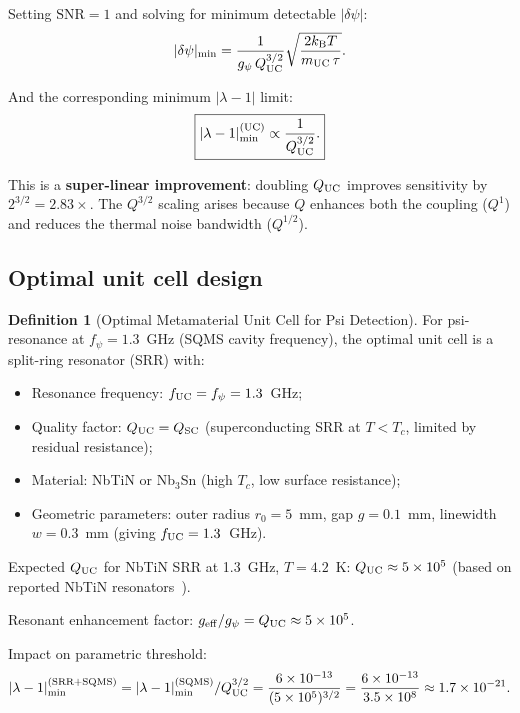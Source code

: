 \documentclass[11pt,twocolumn]{article}
\newcommand{\dpsi}{\delta\psi}
\newcommand{\lam}{\lambda}
\newcommand{\ee}[1]{\times 10^{#1}}
\newcommand{\kB}{k_{\mathrm{B}}}
\newcommand{\SNR}{\mathrm{SNR}}
\theoremstyle{definition}
\newtheorem{definition}[theorem]{Definition}
\theoremstyle{remark}
\begin{document}
Setting $\SNR = 1$ and solving for minimum detectable $|\dpsi|$:
\begin{equation}
|\dpsi|_{\rm min} = \frac{1}{g_\psi\,Q_{\rm UC}^{3/2}}
\sqrt{\frac{2\kB T}{m_{\rm UC}\,\tau}}.
\label{eq:dpsi_min_UC}
\end{equation}

And the corresponding minimum $|\lam-1|$ limit:
\begin{equation}
\boxed{
|\lam-1|_{\rm min}^{(\rm UC)} \propto \frac{1}{Q_{\rm UC}^{3/2}}.
}
\label{eq:lambda_min_UC}
\end{equation}

This is a \textbf{super-linear improvement}: doubling $Q_{\rm UC}$
improves sensitivity by $2^{3/2} = 2.83\times$.  The $Q^{3/2}$ scaling
arises because $Q$ enhances both the coupling ($Q^1$) and reduces the
thermal noise bandwidth ($Q^{1/2}$).

\subsection{Optimal unit cell design}
\label{sec:UC_design}

\begin{definition}[Optimal Metamaterial Unit Cell for Psi Detection]
\label{def:optimal_UC}
For psi-resonance at $f_\psi = 1.3$~GHz (SQMS cavity frequency), the
optimal unit cell is a split-ring resonator (SRR) with:
\begin{itemize}[nosep]
\item Resonance frequency: $f_{\rm UC} = f_\psi = 1.3$~GHz;
\item Quality factor: $Q_{\rm UC} = Q_{\rm SC}$ (superconducting SRR
      at $T < T_c$, limited by residual resistance);
\item Material: NbTiN or Nb$_3$Sn (high $T_c$, low surface resistance);
\item Geometric parameters: outer radius $r_0 = 5$~mm, gap $g = 0.1$~mm,
      linewidth $w = 0.3$~mm (giving $f_{\rm UC} = 1.3$~GHz).
\end{itemize}
Expected $Q_{\rm UC}$ for NbTiN SRR at 1.3~GHz, $T = 4.2$~K:
$Q_{\rm UC} \approx 5\times10^5$ (based on reported NbTiN resonators~\cite{Vissers2010}).
\end{definition}

Resonant enhancement factor: $g_{\rm eff}/g_\psi = Q_{\rm UC} \approx 5\ee{5}$.

Impact on parametric threshold:
\begin{equation}
|\lam-1|_{\rm min}^{(\rm SRR+SQMS)}
= |\lam-1|_{\rm min}^{(\rm SQMS)}/Q_{\rm UC}^{3/2}
= \frac{6\ee{-13}}{(5\ee{5})^{3/2}}
= \frac{6\ee{-13}}{3.5\ee{8}}
\approx 1.7\ee{-21}.
\label{eq:lambda_SRR}
\end{equation}
\end{document}
